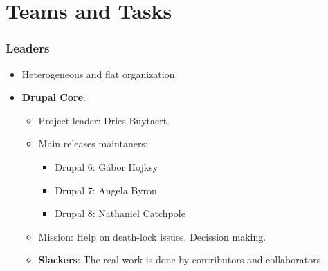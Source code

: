 \section{Teams and Tasks}
\begin{frame}[allowframebreaks]
\frametitle{Leaders}
\begin{itemize}
\item Heterogeneous and flat organization.
\item \textbf{Drupal Core}: 
\begin{itemize}
\item {Project leader}: Dries Buytaert.
\item {Main releases maintaners}: 
\begin{itemize}
\item {Drupal 6}: Gábor Hojksy
\item {Drupal 7}: Angela Byron
\item {Drupal 8}: Nathaniel Catchpole
\end{itemize}
\item {Mission}: Help on death-lock issues. Decission making.
\item {\textbf{Slackers}}: The real work is done by contributors and collaborators.
\end{itemize}
\end{itemize}
\end{frame}
